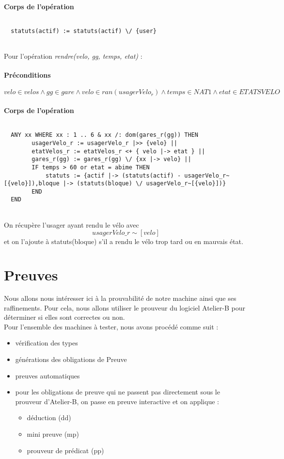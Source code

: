 \documentclass[12pt]{article}
\begin{document}
\paragraph{Corps de l'opération}
\[\]
\begin{lstlisting}
  statuts(actif) := statuts(actif) \/ {user}
\end{lstlisting} \\
\newpage
Pour l'opération \textit{rendre(velo, gg, temps, etat)} :
\paragraph{Préconditions}
\[ velo \in velos \land gg \in gare \land velo \in ran(usagerVelo_r) \land temps \in NAT1 \land etat \in ETATSVELO\]
\paragraph{Corps de l'opération}
\[\]
\begin{lstlisting}
  ANY xx WHERE xx : 1 .. 6 & xx /: dom(gares_r(gg)) THEN
        usagerVelo_r := usagerVelo_r |>> {velo} ||
        etatVelos_r := etatVelos_r <+ { velo |-> etat } ||
        gares_r(gg) := gares_r(gg) \/ {xx |-> velo} ||
        IF temps > 60 or etat = abime THEN
            statuts := {actif |-> (statuts(actif) - usagerVelo_r~[{velo}]),bloque |-> (statuts(bloque) \/ usagerVelo_r~[{velo}])}
        END
  END
\end{lstlisting} \\
On récupère l'usager ayant rendu le vélo avec \[usagerVelo\_r\sim[{velo}]\] et on l'ajoute à statuts(bloque) s'il a rendu le vélo trop tard ou en mauvais état.
\newpage
\section{Preuves}
Nous allons nous intéresser ici à la prouvabilité de notre machine ainsi que ses raffinements. Pour cela, nous allons utiliser le prouveur du logiciel Atelier-B pour déterminer si elles sont correctes ou non.\\

Pour l'ensemble des machines à tester, nous avons procédé comme suit :
\begin{itemize}
  \item vérification des types
  \item générations des obligations de Preuve
  \item preuves automatiques
  \item pour les obligations de preuve qui ne passent pas directement sous le prouveur d'Atelier-B, on passe en preuve interactive et on applique :
  \begin{itemize}
    \item déduction (dd)
    \item mini preuve (mp)
    \item prouveur de prédicat (pp)
  \end{itemize}
\end{itemize}
\end{document}
